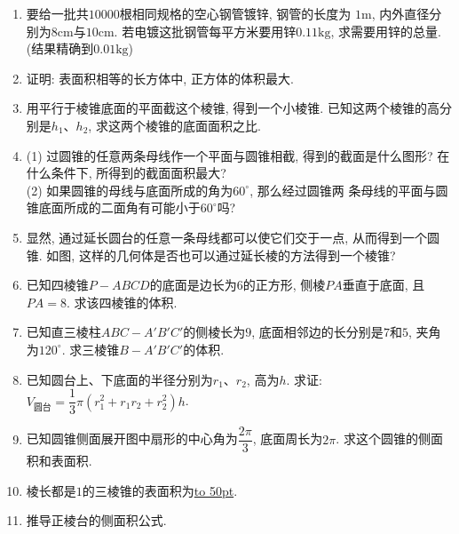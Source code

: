 \documentclass[10pt,a4paper]{article}
\newcommand{\blank}[1]{\underline{\hbox to #1pt{}}}
\begin{document}
\begin{enumerate}[1.]
\begin{center}
\end{center}
\item 要给一批共$10000$根相同规格的空心钢管镀锌, 钢管的长度为
$1\text{m}$, 内外直径分别为$8\text{cm}$与$10\text{cm}$. 若电镀这批钢管每平方米要用锌$0.11\text{kg}$, 求需要用锌的总量. (结果精确到$0. 01\text{kg}$)
\item 证明: 表面积相等的长方体中, 正方体的体积最大.
\item 用平行于棱锥底面的平面截这个棱锥, 得到一个小棱锥. 已知这两个棱锥的高分别是$h_1$、$h_2$, 求这两个棱锥的底面面积之比.
\item (1) 过圆锥的任意两条母线作一个平面与圆锥相截, 得到的截面是什么图形?  在什么条件下, 所得到的截面面积最大? \\
(2) 如果圆锥的母线与底面所成的角为$60^\circ$, 那么经过圆锥两
条母线的平面与圆锥底面所成的二面角有可能小于$60^\circ$吗? 
\item 显然, 通过延长圆台的任意一条母线都可以使它们交于一点, 从而得到一个圆锥. 如图, 这样的几何体是否也可以通过延长棱的方法得到一个棱锥?
\begin{center}
\end{center}
\item 已知四棱锥$P-ABCD$的底面是边长为$6$的正方形, 侧棱$PA$垂直于底面, 且$PA=8$. 求该四棱锥的体积.
\item 已知直三棱柱$ABC-A'B'C'$的侧棱长为$9$, 底面相邻边的长分别是$7$和$5$, 夹角为$120^\circ$. 求三棱锥$B-A'B'C'$的体积.
\item 已知圆台上、下底面的半径分别为$r_1$、$r_2$, 高为$h$. 求证: $V_{\text{圆台}}=\dfrac 13\pi (r_1^2+r_1r_2+r_2^2)h$.
\item 已知圆锥侧面展开图中扇形的中心角为$\dfrac{2\pi}3$, 底面周长为$2\pi$. 求这个圆锥的侧面积和表面积.
\item 棱长都是$1$的三棱锥的表面积为\blank{50}.
\item 推导正棱台的侧面积公式.

\end{enumerate}
\end{document}
